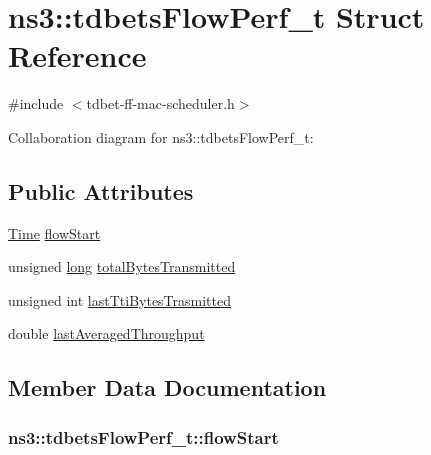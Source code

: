 \hypertarget{structns3_1_1tdbetsFlowPerf__t}{}\section{ns3\+:\+:tdbets\+Flow\+Perf\+\_\+t Struct Reference}
\label{structns3_1_1tdbetsFlowPerf__t}


{\ttfamily \#include $<$tdbet-\/ff-\/mac-\/scheduler.\+h$>$}



Collaboration diagram for ns3\+:\+:tdbets\+Flow\+Perf\+\_\+t\+:
\subsection*{Public Attributes}
\begin{DoxyCompactItemize}
\item 
\hyperlink{classns3_1_1Time}{Time} \hyperlink{structns3_1_1tdbetsFlowPerf__t_a3869698c1d996a94a1bc370a1ab59b75}{flow\+Start}
\item 
unsigned \hyperlink{generate__test__data__lte__sinr_8m_a0eab6be67e93c3411f7a8b53cc297285}{long} \hyperlink{structns3_1_1tdbetsFlowPerf__t_a391813e0a5afb574d139e263a852c93a}{total\+Bytes\+Transmitted}
\item 
unsigned int \hyperlink{structns3_1_1tdbetsFlowPerf__t_a42375746ea04f9120e15fa2ec4b2b460}{last\+Tti\+Bytes\+Trasmitted}
\item 
double \hyperlink{structns3_1_1tdbetsFlowPerf__t_a23e9b2fa2e4695acfce6c1f42f5f051a}{last\+Averaged\+Throughput}
\end{DoxyCompactItemize}


\subsection{Member Data Documentation}
\subsubsection[{\texorpdfstring{flow\+Start}{flowStart}}]{ ns3\+::tdbets\+Flow\+Perf\+\_\+t\+::flow\+Start}\hypertarget{structns3_1_1tdbetsFlowPerf__t_a3869698c1d996a94a1bc370a1ab59b75}{}\label{structns3_1_1tdbetsFlowPerf__t_a3869698c1d996a94a1bc370a1ab59b75}
